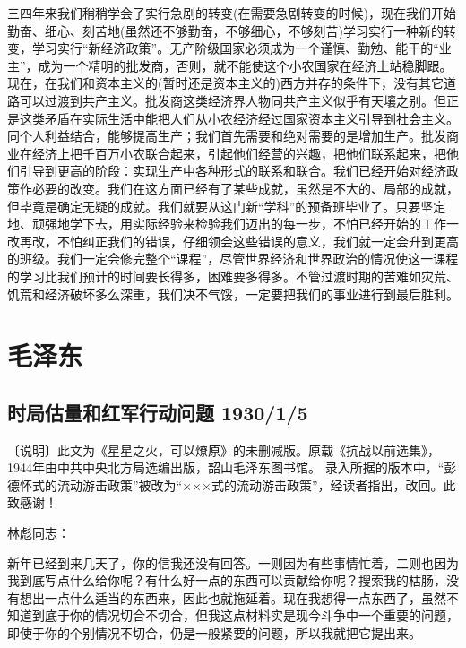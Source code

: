 \documentclass[UTF8, 12pt, a4paper]{ctexrep}
\begin{document}
三四年来我们稍稍学会了实行急剧的转变(在需要急剧转变的时候)，现在我们开始勤奋、细心、刻苦地(虽然还不够勤奋，不够细心，不够刻苦)学习实行一种新的转变，学习实行“新经济政策”。无产阶级国家必须成为一个谨慎、勤勉、能干的“业主”，成为一个精明的批发商，否则，就不能使这个小农国家在经济上站稳脚跟。现在，在我们和资本主义的(暂时还是资本主义的)西方并存的条件下，没有其它道路可以过渡到共产主义。批发商这类经济界人物同共产主义似乎有天壤之别。但正是这类矛盾在实际生活中能把人们从小农经济经过国家资本主义引导到社会主义。同个人利益结合，能够提高生产；我们首先需要和绝对需要的是增加生产。批发商业在经济上把千百万小农联合起来，引起他们经营的兴趣，把他们联系起来，把他们引导到更高的阶段：实现生产中各种形式的联系和联合。我们已经开始对经济政策作必要的改变。我们在这方面已经有了某些成就，虽然是不大的、局部的成就，但毕竟是确定无疑的成就。我们就要从这门新“学科”的预备班毕业了。只要坚定地、顽强地学下去，用实际经验来检验我们迈出的每一步，不怕已经开始的工作一改再改，不怕纠正我们的错误，仔细领会这些错误的意义，我们就一定会升到更高的班级。我们一定会修完整个“课程”，尽管世界经济和世界政治的情况使这一课程的学习比我们预计的时间要长得多，困难要多得多。不管过渡时期的苦难如灾荒、饥荒和经济破坏多么深重，我们决不气馁，一定要把我们的事业进行到最后胜利。

\newpage
\chapter{毛泽东}
\newpage

\section{时局估量和红军行动问题 1930/1/5}

〔说明〕此文为《星星之火，可以燎原》的未删减版。原载《抗战以前选集》，1944年由中共中央北方局选编出版，韶山毛泽东图书馆。
录入所据的版本中，“彭德怀式的流动游击政策”被改为“×××式的流动游击政策”，经读者指出，改回。此致感谢！


林彪同志：

新年已经到来几天了，你的信我还没有回答。一则因为有些事情忙着，二则也因为我到底写点什么给你呢？有什么好一点的东西可以贡献给你呢？搜索我的枯肠，没有想出一点什么适当的东西来，因此也就拖延着。现在我想得一点东西了，虽然不知道到底于你的情况切合不切合，但我这点材料实是现今斗争中一个重要的问题，即使于你的个别情况不切合，仍是一般紧要的问题，所以我就把它提出来。
\end{document}
